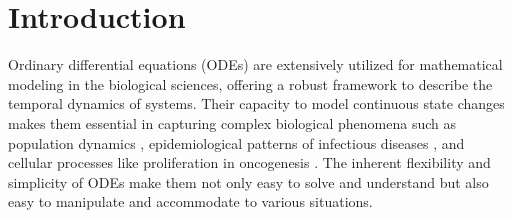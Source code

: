 \documentclass[12pt]{article}
\begin{document}
\section{Introduction}
Ordinary differential equations (ODEs) are extensively utilized for mathematical modeling in the biological sciences, offering a robust framework to describe the temporal dynamics of systems. Their capacity to model continuous state changes makes them essential in capturing complex biological phenomena such as population dynamics \cite{salisbury2011mathematical}\cite{sego2021generation}, epidemiological patterns of infectious diseases \cite{Anderson1991}\cite{Diekmann2000}\cite{Feng2016}, and cellular processes like proliferation in oncogenesis \cite{baker1998modelling}\cite{jarrett2018mathematical}. The inherent flexibility and simplicity of ODEs make them not only easy to solve and understand but also easy to manipulate and accommodate to various situations.
\end{document}
